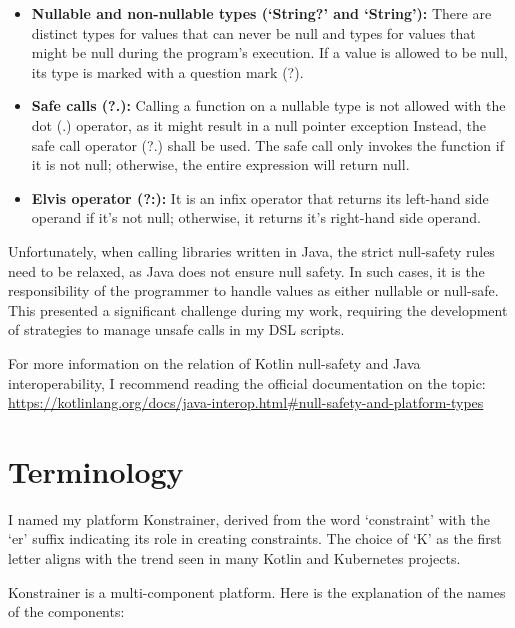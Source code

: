 \begin{itemize}
    \item \textbf{Nullable and non-nullable types (`String?' and `String'):} There are distinct types for values that can never be null and types for values that might be null during the program's execution. If a value is allowed to be null, its type is marked with a question mark (?).
    \item \textbf{Safe calls (?.):} Calling a function on a nullable type is not allowed with the dot (.) operator, as it might result in a null pointer exception Instead, the safe call operator (?.) shall be used. The safe call only invokes the function if it is not null; otherwise, the entire expression will return null.
    \item \textbf{Elvis operator (?:):} It is an infix operator that returns its left-hand side operand if it's not null; otherwise, it returns it's right-hand side operand.
\end{itemize}

Unfortunately, when calling libraries written in Java, the strict null-safety rules need to be relaxed, as Java does not ensure null safety. In such cases, it is the responsibility of the programmer to handle values as either nullable or null-safe. This presented a significant challenge during my work, requiring the development of strategies to manage unsafe calls in my DSL scripts.

For more information on the relation of Kotlin null-safety and Java interoperability, I recommend reading the official documentation on the topic: \url{https://kotlinlang.org/docs/java-interop.html\#null-safety-and-platform-types}

\section{Terminology}

I named my platform Konstrainer, derived from the word `constraint' with the `er' suffix indicating its role in creating constraints. The choice of `K' as the first letter aligns with the trend seen in many Kotlin and Kubernetes projects.


Konstrainer is a multi-component platform. Here is the explanation of the names of the components:

